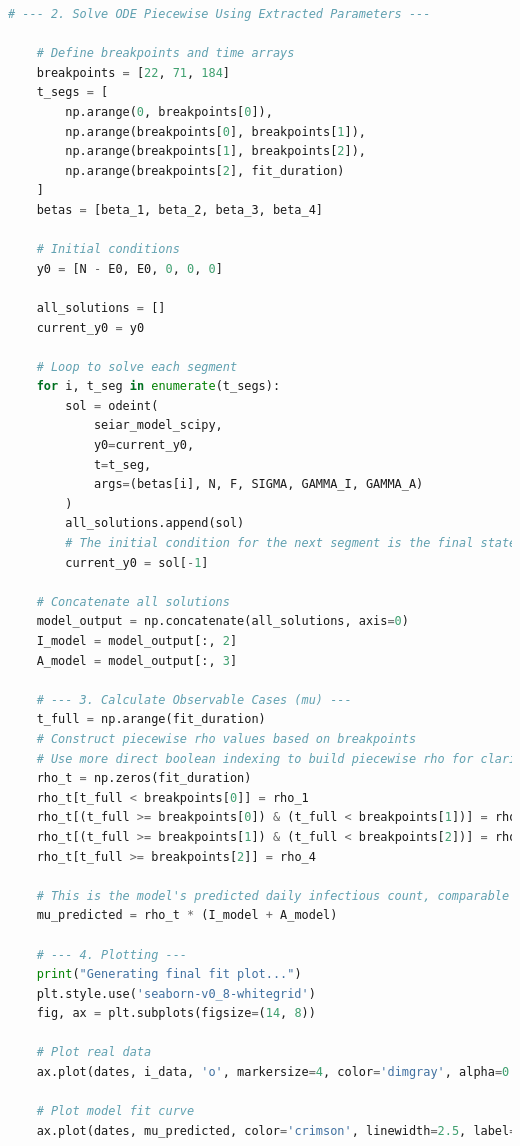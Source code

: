 \documentclass[12pt, a4paper]{article}
\begin{document}
\begin{lstlisting}[language=Python, caption=Python script for plotting the Bayesian model fit and running the scenario analysis.]
    # --- 2. Solve ODE Piecewise Using Extracted Parameters ---
    
    # Define breakpoints and time arrays
    breakpoints = [22, 71, 184]
    t_segs = [
        np.arange(0, breakpoints[0]),
        np.arange(breakpoints[0], breakpoints[1]),
        np.arange(breakpoints[1], breakpoints[2]),
        np.arange(breakpoints[2], fit_duration)
    ]
    betas = [beta_1, beta_2, beta_3, beta_4]
    
    # Initial conditions
    y0 = [N - E0, E0, 0, 0, 0]
    
    all_solutions = []
    current_y0 = y0
    
    # Loop to solve each segment
    for i, t_seg in enumerate(t_segs):
        sol = odeint(
            seiar_model_scipy,
            y0=current_y0,
            t=t_seg,
            args=(betas[i], N, F, SIGMA, GAMMA_I, GAMMA_A)
        )
        all_solutions.append(sol)
        # The initial condition for the next segment is the final state of the current one
        current_y0 = sol[-1]
        
    # Concatenate all solutions
    model_output = np.concatenate(all_solutions, axis=0)
    I_model = model_output[:, 2]
    A_model = model_output[:, 3]
    
    # --- 3. Calculate Observable Cases (mu) ---
    t_full = np.arange(fit_duration)
    # Construct piecewise rho values based on breakpoints
    # Use more direct boolean indexing to build piecewise rho for clarity and robustness
    rho_t = np.zeros(fit_duration)
    rho_t[t_full < breakpoints[0]] = rho_1
    rho_t[(t_full >= breakpoints[0]) & (t_full < breakpoints[1])] = rho_2
    rho_t[(t_full >= breakpoints[1]) & (t_full < breakpoints[2])] = rho_3
    rho_t[t_full >= breakpoints[2]] = rho_4
                         
    # This is the model's predicted daily infectious count, comparable to the real data
    mu_predicted = rho_t * (I_model + A_model)

    # --- 4. Plotting ---
    print("Generating final fit plot...")
    plt.style.use('seaborn-v0_8-whitegrid')
    fig, ax = plt.subplots(figsize=(14, 8))
    
    # Plot real data
    ax.plot(dates, i_data, 'o', markersize=4, color='dimgray', alpha=0.7, label='Observed Data (7-day smoothed)')
    
    # Plot model fit curve
    ax.plot(dates, mu_predicted, color='crimson', linewidth=2.5, label='SEIAR Model Prediction (Mean Posterior)')
    

\end{lstlisting}
\end{document}
